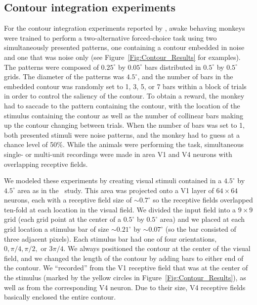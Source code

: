 \subsection{Contour integration experiments} 
\label{sec:contour_exp}
For the contour integration experiments reported by
\cite{Chen_etal14}, awake behaving
 monkeys were trained to perform a two-alternative
forced-choice task using two simultaneously presented patterns, one
containing a contour embedded in noise and one that was noise only
(see Figure~\ref{Fig:Contour_Results} for examples). 
The patterns
were composed of 
$0.25^{\circ}$ by $0.05^{\circ}$
bars distributed in $0.5^{\circ}$ by $0.5^{\circ}$ grids. 
The diameter
of the patterns was $4.5^{\circ}$, and the number of bars in the
embedded contour was randomly set to 1, 3, 5, or 7 bars within a block
of trials in order to control the saliency of the contour.
To obtain a reward, the
monkey had to saccade to the pattern containing the contour, 
with the location of the stimulus containing the contour as well as the number
of collinear bars making up the contour  changing between trials. 
 When the number of bars was set to 1, both presented stimuli were noise patterns, and the monkey had to guess at a chance level of 50\%. 
 While the animals were performing the task, simultaneous
single- or multi-unit recordings were made in area V1 and V4 neurons with
overlapping receptive fields. 

We modeled these experiments by creating visual stimuli
contained in a $4.5^{\circ}$ by $4.5^{\circ}$ area
as in the~\cite{Chen_etal14}  study. This area was projected onto
a V1 layer of $64 \times 64$ neurons, each with a receptive field
size of $\sim0.7^{\circ}$  
so the receptive fields overlapped ten-fold at each location in the visual
field. 
We divided the input field into a $9 \times 9$ grid (each grid point
at the center of a $0.5^{\circ}$ by $0.5^{\circ}$ area)
and we placed at each grid location a
stimulus bar of size $\sim0.21^{\circ}$ by $\sim0.07^{\circ}$ 
(so the bar consisted of three adjacent pixels).
Each stimulus bar had one of four orientations, 
$0, \pi/4, \pi/2,$ or $3\pi/4$. 
We always positioned the
contour at the center of the  
visual field,
and we changed the length of the
contour by adding bars to either end 
 of the contour. We
``recorded'' from the V1 receptive field that was at the center of the
stimulus (marked by the yellow circles in Figure~\ref{Fig:Contour_Results}),
as well as from the corresponding V4 neuron.
Due to their size, V4 receptive fields
basically enclosed the entire
contour.


